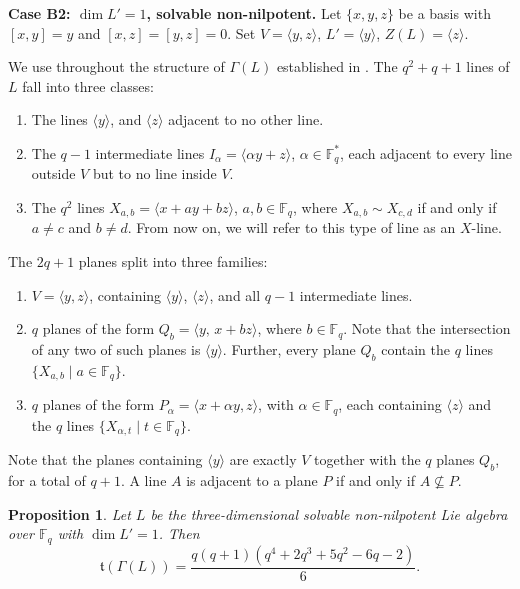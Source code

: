 \documentclass[11pt]{amsart}
\theoremstyle{plain}
\newtheorem{proposition}[theorem]{Proposition}
\def\F{\mathbb{F}}
\begin{document}
\textbf{Case B2: $\dim L' = 1$, solvable non-nilpotent.} Let $\{x,y,z\}$ be a basis with $[x,y]=y$ and $[x,z]=[y,z]=0$. Set $V = \langle y, z \rangle$, $L' = \langle y \rangle$, $Z(L) = \langle z \rangle$. 

We use throughout the structure of $\Gamma(L)$ established in \cite[Proposition 4.5]{TZG}.
The $q^2+q+1$ lines of $L$ fall into three classes:
\begin{enumerate}
  \item The lines $\langle y\rangle$, and $\langle z\rangle$ adjacent to no other line.
  \item The $q-1$ intermediate lines $I_{\alpha}=\langle\alpha y+z\rangle$,
        $\alpha\in\F_q^* $, each adjacent to every line outside $V$
        but to no line inside $V$.
  \item The $q^2$ lines $X_{a,b}=\langle x+ay+bz\rangle$, $a,b\in\F_q$,
        where $X_{a,b}\sim X_{c,d}$ if and only if $a\neq c$ and $b\neq d$. From now on, we will refer to this type of line as an $X$-line. 
\end{enumerate}
The $2q+1$ planes split into three families:
\begin{enumerate}
\item $V=\langle y,z\rangle$, containing $\langle y\rangle$, $\langle z\rangle$,        and all $q-1$ intermediate lines.

\item $q$ planes of the form $Q_b=\langle y,\,x+bz\rangle$, where $b\in\F_q$. Note that the intersection of any two of such planes is $\langle y\rangle$. Further, every plane $Q_b$ contain the $q$ lines $\{X_{a,b}\mid a\in\F_q\}$.

\item $q$ planes of the form $P_{\alpha}=\langle x+\alpha y,z\rangle$, with 
        $\alpha\in\F_q$, each containing $\langle z\rangle$ and the $q$ lines
        $\{X_{\alpha,t}\mid t\in\F_q\}$.
\end{enumerate}
Note that the planes containing $\langle y\rangle$ are exactly $V$ together with
the $q$ planes $Q_b$, for a total of $q+1$.
A line $A$ is adjacent to a plane $P$ if and only if $A\not\subseteq P$.




\begin{proposition}\label{B2}
Let $L$ be the three-dimensional solvable non-nilpotent Lie algebra over $\F_q$ with $\dim L'=1$. Then
\[\mathfrak{t}(\Gamma(L)) = \frac{q(q+1)(q^4+2q^3+5q^2-6q-2)}{6}.\]

\end{proposition}
\end{document}
